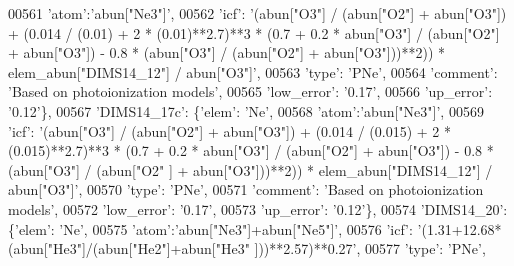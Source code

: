 \begin{DoxyCode}
00561                                        \textcolor{stringliteral}{'atom'}:\textcolor{stringliteral}{'abun["Ne3"]'}, 
00562                                        \textcolor{stringliteral}{'icf'}: \textcolor{stringliteral}{'(abun["O3"] / (abun["O2"] + abun["O3"]) + (0.014 / (0.01) +
       2 * (0.01)**2.7)**3 * (0.7 + 0.2 * abun["O3"] / (abun["O2"] + abun["O3"]) - 0.8 * (abun["O3"] / (abun["O2"]
       + abun["O3"]))**2)) * elem\_abun["DIMS14\_12"] / abun["O3"]'},
00563                                        \textcolor{stringliteral}{'type'}: \textcolor{stringliteral}{'PNe'},
00564                                        \textcolor{stringliteral}{'comment'}: \textcolor{stringliteral}{'Based on photoionization models'},
00565                                        \textcolor{stringliteral}{'low\_error'}: \textcolor{stringliteral}{'0.17'},
00566                                        \textcolor{stringliteral}{'up\_error'}: \textcolor{stringliteral}{'0.12'}\},
00567                          \textcolor{stringliteral}{'DIMS14\_17c'}: \{\textcolor{stringliteral}{'elem'}: \textcolor{stringliteral}{'Ne'},
00568                                        \textcolor{stringliteral}{'atom'}:\textcolor{stringliteral}{'abun["Ne3"]'}, 
00569                                        \textcolor{stringliteral}{'icf'}: \textcolor{stringliteral}{'(abun["O3"] / (abun["O2"] + abun["O3"]) + (0.014 / (0.015) +
       2 * (0.015)**2.7)**3 * (0.7 + 0.2 * abun["O3"] / (abun["O2"] + abun["O3"]) - 0.8 * (abun["O3"] / (abun["O2"
      ] + abun["O3"]))**2)) * elem\_abun["DIMS14\_12"] / abun["O3"]'},
00570                                        \textcolor{stringliteral}{'type'}: \textcolor{stringliteral}{'PNe'},
00571                                        \textcolor{stringliteral}{'comment'}: \textcolor{stringliteral}{'Based on photoionization models'},
00572                                        \textcolor{stringliteral}{'low\_error'}: \textcolor{stringliteral}{'0.17'},
00573                                        \textcolor{stringliteral}{'up\_error'}: \textcolor{stringliteral}{'0.12'}\},
00574                          \textcolor{stringliteral}{'DIMS14\_20'}: \{\textcolor{stringliteral}{'elem'}: \textcolor{stringliteral}{'Ne'},
00575                                        \textcolor{stringliteral}{'atom'}:\textcolor{stringliteral}{'abun["Ne3"]+abun["Ne5"]'}, 
00576                                        \textcolor{stringliteral}{'icf'}: \textcolor{stringliteral}{'(1.31+12.68*(abun["He3"]/(abun["He2"]+abun["He3"
      ]))**2.57)**0.27'},
00577                                        \textcolor{stringliteral}{'type'}: \textcolor{stringliteral}{'PNe'},

\end{DoxyCode}
